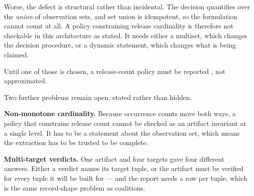 Worse, the defect is structural rather than incidental. The decision quantifies
over the \emph{union} of observation sets, and set union is idempotent, so the
formulation cannot count at all. A policy constraining release cardinality is
therefore not checkable in this architecture as stated. It needs either a
multiset, which changes the decision procedure, or a dynamic statement, which
changes what is being claimed.

Until one of those is chosen, a release-count policy must be reported
\Unknown{}, not approximated.

\medskip
Two further problems remain open, stated rather than hidden.

\textbf{Non-monotone cardinality.} Because occurrence counts move both ways, a
policy that constrains release count cannot be checked as an artifact invariant
at a single level. It has to be a statement about the observation set, which
means the extraction has to be trusted to be complete.

\textbf{Multi-target verdicts.} One artifact and four targets gave four different
answers. Either a verdict names its target tuple, or the artifact must be
verified for every tuple it will be built for --- and the report needs a row per
tuple, which is the same record-shape problem as coalitions.
